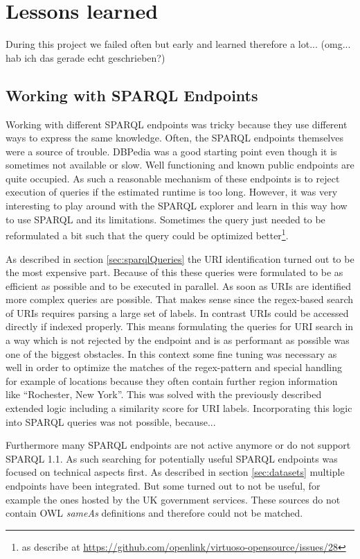 \section{Lessons learned}
During this project we failed often but early and learned therefore a lot... (omg... hab ich das gerade echt geschrieben?)

\subsection{Working with SPARQL Endpoints}
Working with different SPARQL endpoints was tricky because they use different ways to express the same knowledge. Often, the SPARQL endpoints themselves were a source of trouble. DBPedia was a good starting point even though it is sometimes not available or slow. Well functioning and known public endpoints are quite occupied. As such a reasonable mechanism of these endpoints is to reject execution of queries if the estimated runtime is too long. However, it was very interesting to play around with the SPARQL explorer and learn in this way how to use SPARQL and its limitations. Sometimes the query just needed to be reformulated a bit such that the query could be optimized better\footnote{as describe at \url{https://github.com/openlink/virtuoso-opensource/issues/28}}.

As described in section \ref{sec:sparqlQueries} the URI identification turned out to be the most expensive part. Because of this  these queries were formulated to be as efficient as possible and to be executed in parallel. As soon as URIs are identified more complex queries are possible. That makes sense since the regex-based search of URIs requires parsing a large set of labels. In contrast URIs could be accessed directly if indexed properly. This means formulating the queries for URI search in a way which is not rejected by the endpoint and is as performant as possible was one of the biggest obstacles. In this context some fine tuning was necessary as well in order to optimize the matches of the regex-pattern and special handling  for example of locations because they often contain further region information like ``Rochester, New York''. This was solved with the previously described extended logic including a similarity score for URI labels. Incorporating this logic into SPARQL queries was not possible, because...

Furthermore many SPARQL endpoints are not active anymore or do not support SPARQL 1.1. As such searching for potentially useful SPARQL endpoints was focused on technical aspects first. As described in section \ref{sec:datasets} multiple endpoints have been integrated. But some turned out to not be useful, for example the ones hosted by the UK government services. These sources do not contain OWL \textit{sameAs} definitions and therefore could not be matched.

